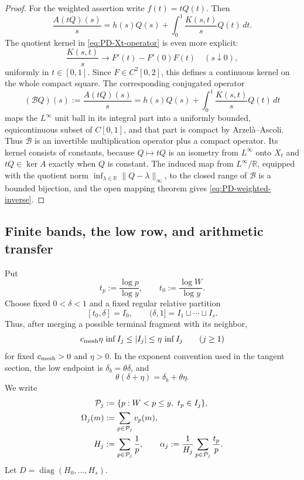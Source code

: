 \documentclass[11pt]{article}
\numberwithin{equation}{section}
\theoremstyle{definition}
\theoremstyle{remark}
\newcommand{\1}{\mathbf 1}
\begin{document}
\begin{proof}
For the weighted assertion write \(f(t)=tQ(t)\).  Then
\begin{equation}
 \frac{A(tQ)(s)}s
 =h(s)Q(s)+\int_0^1\frac{K(s,t)}sQ(t)\,dt.
\label{eq:PD-Xt-operator}
\end{equation}
The quotient kernel in \eqref{eq:PD-Xt-operator} is even more explicit:
\begin{equation}
 \frac{K(s,t)}s\longrightarrow F'(t)-F'(0)F(t)
 \quad(s\downarrow0),
 \label{eq:smooth-weighted-kernel-axis}
\end{equation}
uniformly in \(t\in[0,1]\).  Since \(F\in C^2[0,2]\), this defines a
continuous kernel on the whole compact square.  The corresponding
conjugated operator
\[
 (\mathcal BQ)(s):=\frac{A(tQ)(s)}s
 =h(s)Q(s)+\int_0^1\frac{K(s,t)}sQ(t)\,dt
\]
maps the \(L^\infty\) unit ball in its integral part into a uniformly
bounded, equicontinuous subset of \(C[0,1]\), and that part is compact by
Arzel\`a--Ascoli.  Thus \(\mathcal B\) is an invertible multiplication
operator plus a compact operator.  Its kernel consists of constants,
because \(Q\mapsto tQ\) is an isometry from \(L^\infty\) onto \(X_t\)
and \(tQ\in\ker A\) exactly when \(Q\) is constant.  The induced map from
\(L^\infty/\mathbb R\), equipped with the quotient norm
\(\inf_{\lambda\in\mathbb R}\|Q-\lambda\|_\infty\), to the closed range
of \(\mathcal B\) is a bounded bijection, and the open mapping theorem gives
\eqref{eq:PD-weighted-inverse}.
\end{proof}

\subsection{Finite bands, the low row, and arithmetic transfer}
\label{subsec:smooth-finite-bands}

Put
\[
 t_p:=\frac{\log p}{\log y},\qquad
 t_0:=\frac{\log W}{\log y}.
\]
Choose fixed \(0<\delta<1\) and a fixed regular relative partition
\[
 [t_0,\delta]=I_0,\qquad
 (\delta,1]=I_1\sqcup\cdots\sqcup I_s.
\]
Thus, after merging a possible terminal fragment with its neighbor,
\begin{equation}
 c_{\rm mesh}\eta\,\inf I_j
 \leq |I_j|\leq \eta\,\inf I_j
       \qquad(j\geq1)
\label{eq:smooth-regular-relative-mesh}
\end{equation}
for fixed \(c_{\rm mesh}>0\) and \(\eta>0\).  In the exponent convention
used in the tangent section, the low endpoint is
\(\delta_b=\theta\delta\), and
\[
 \theta(\delta+\eta)=\delta_b+\theta\eta.
\]
We write
\begin{align}
 \mathcal P_j&:=\{p:W<p\leq y,\ t_p\in I_j\},\notag\\
 \Omega_j(m)&:=\sum_{p\in\mathcal P_j}v_p(m),\notag\\
 H_j&:=\sum_{p\in\mathcal P_j}\frac1p,\qquad
 \alpha_j:=\frac1{H_j}
          \sum_{p\in\mathcal P_j}\frac{t_p}{p}.
\label{eq:smooth-band-data}
\end{align}
Let \(D=\operatorname{diag}(H_0,\ldots,H_s)\).
\end{document}
